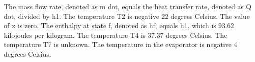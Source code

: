 The mass flow rate, denoted as m dot, equals the heat transfer rate, denoted as Q dot, divided by h1. The temperature T2 is negative 22 degrees Celsius. The value of x is zero. The enthalpy at state f, denoted as hf, equals h1, which is 93.62 kilojoules per kilogram. The temperature T4 is 37.37 degrees Celsius. The temperature T7 is unknown. The temperature in the evaporator is negative 4 degrees Celsius.